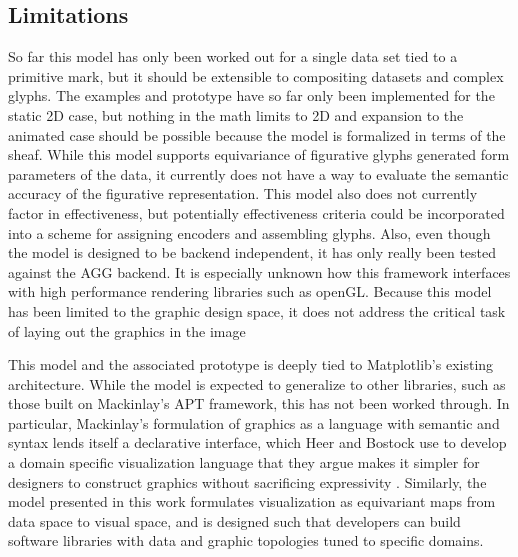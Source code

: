 \documentclass[../main.tex]{subfiles}
\begin{document}
\subsection{Limitations}

So far this model has only been worked out for a single data set tied to a primitive mark, but it should be extensible to compositing datasets and complex glyphs. The examples and prototype have so far only been implemented for the static 2D case, but nothing in the math limits to 2D and expansion to the animated case should be possible because the model is formalized in terms of the sheaf. While this model supports equivariance of figurative glyphs generated form parameters of the data\cite{beckfeathers2014,byrneFigurativeFramesCritical2017}, it currently does not have a way to evaluate the semantic accuracy of the figurative representation. This model also does not currently factor in effectiveness, but potentially effectiveness criteria could be incorporated into a scheme for assigning encoders and assembling glyphs. Also, even though the model is designed to be backend independent, it has only really been tested against the AGG backend. It is especially unknown how this framework interfaces with high performance rendering libraries such as openGL\cite{CarsonOpenGL1997}.  Because this model has been limited to the graphic design space, it does not address the critical task of laying out the graphics in the image

This model and the associated prototype is deeply tied to Matplotlib's existing architecture. While the model is expected to generalize to other libraries, such as those built on Mackinlay's APT framework, this has not been worked through. In particular, Mackinlay's formulation of graphics as a language with semantic and syntax lends itself a declarative interface\cite{loudenProgrammingLanguagesPrinciples2010}, which Heer and Bostock use to develop a domain specific visualization language that they argue makes it simpler for designers to construct graphics without sacrificing expressivity \cite{heerDeclarative2010}. Similarly, the model presented in this work formulates visualization as equivariant maps from data space to visual space, and is designed such that developers can build software libraries with data and graphic topologies tuned to specific domains. 
\end{document}
